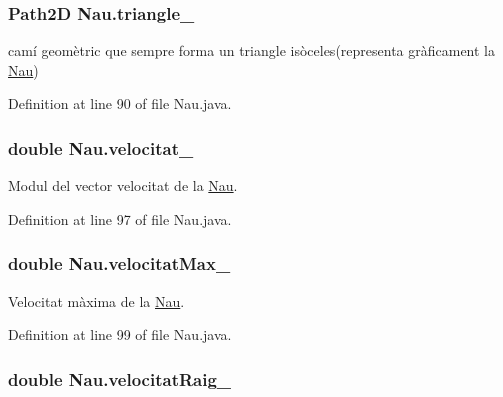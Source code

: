\subsubsection[{triangle\+\_\+}]{\setlength{\rightskip}{0pt plus 5cm}Path2\+D Nau.\+triangle\+\_\+\hspace{0.3cm}{\ttfamily [protected]}}\label{class_nau_ad397487e3dc0062cc71fdfc4c562e347}


camí geomètric que sempre forma un triangle isòceles(representa gràficament la \hyperlink{class_nau}{Nau}) 



Definition at line 90 of file Nau.\+java.

\hypertarget{class_nau_ac1151817b8deaed7c77ceba3141b86e5}{}
\subsubsection[{velocitat\+\_\+}]{\setlength{\rightskip}{0pt plus 5cm}double Nau.\+velocitat\+\_\+\hspace{0.3cm}{\ttfamily [protected]}}\label{class_nau_ac1151817b8deaed7c77ceba3141b86e5}


Modul del vector velocitat de la \hyperlink{class_nau}{Nau}. 



Definition at line 97 of file Nau.\+java.

\hypertarget{class_nau_a6a18449674ed5d2317a6795bd56f7dd0}{}
\subsubsection[{velocitat\+Max\+\_\+}]{\setlength{\rightskip}{0pt plus 5cm}double Nau.\+velocitat\+Max\+\_\+\hspace{0.3cm}{\ttfamily [private]}}\label{class_nau_a6a18449674ed5d2317a6795bd56f7dd0}


Velocitat màxima de la \hyperlink{class_nau}{Nau}. 



Definition at line 99 of file Nau.\+java.

\hypertarget{class_nau_a1400505da3bafa2056c8e542a7811b33}{}
\subsubsection[{velocitat\+Raig\+\_\+}]{\setlength{\rightskip}{0pt plus 5cm}double Nau.\+velocitat\+Raig\+\_\+\hspace{0.3cm}{\ttfamily [protected]}}\label{class_nau_a1400505da3bafa2056c8e542a7811b33}


